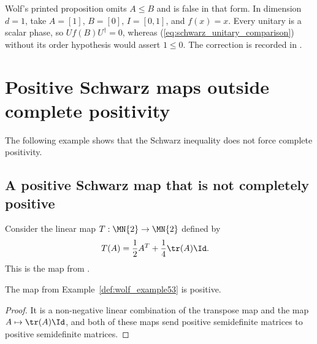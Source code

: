 \begin{remark}
    \label{rem:wolf_unitary_comparison_counterexample}
    Wolf's printed proposition omits $A\leq B$ and is false in that form. In
    dimension $d=1$, take $A=[1]$, $B=[0]$, $I=[0,1]$, and $f(x)=x$.
    Every unitary is a scalar phase, so $Uf(B)U^\dagger=0$, whereas
    (\ref{eq:schwarz_unitary_comparison}) without its order hypothesis would
    assert $1\leq0$. The correction is recorded in
    \cite{gap:wolf_ch5_unitary_comparison_missing_order}.
\end{remark}

\section{Positive Schwarz maps outside complete positivity}

The following example shows that the Schwarz inequality does not force complete
positivity.

\subsection{A positive Schwarz map that is not completely positive}

\begin{example}\label{def:wolf_example53}
    \leanok
    Consider the linear map $T : \MN{2} \to \MN{2}$ defined by
    \begin{align}
        T(A) & =\frac{1}{2} A^T+\frac{1}{4}\tr(A)\Id.
        \notag
    \end{align}
    This is the map from \cite[Example~5.3]{Wolf2012Quantum}.
\end{example}

\begin{theorem}\label{thm:wolf_example53_positive}
    \leanok
    The map from Example~\ref{def:wolf_example53} is positive.
\end{theorem}

\begin{proof}
    \leanok
    It is a non-negative linear combination of the transpose map and the map
    $A \mapsto \tr(A) \Id$, and both of these maps send positive
    semidefinite matrices to positive semidefinite matrices.
\end{proof}

